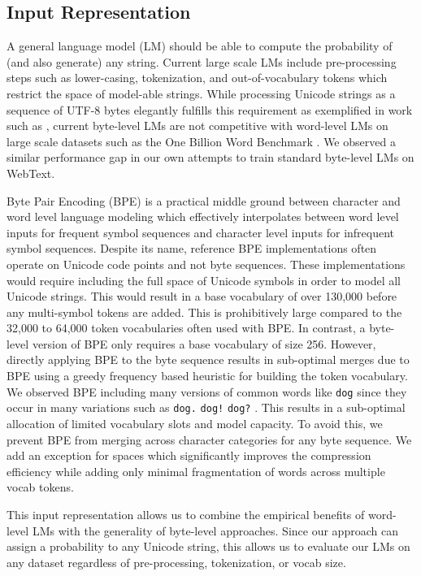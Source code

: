 \documentclass{article}
\begin{document}
\subsection{Input Representation}

A general language model (LM) should be able to compute the probability of (and also generate) any string. Current large scale LMs include pre-processing steps such as lower-casing, tokenization, and out-of-vocabulary tokens which restrict the space of model-able strings. While processing Unicode strings as a sequence of UTF-8 bytes elegantly fulfills this requirement as exemplified in work such as \citet{gillick2015multilingual}, current byte-level LMs are not competitive with word-level LMs on large scale datasets such as the One Billion Word Benchmark \cite{al2018character}. We observed a similar performance gap in our own attempts to train standard byte-level LMs on WebText.

Byte Pair Encoding (BPE) \cite{sennrich2015neural} is a practical middle ground between character and word level language modeling which effectively interpolates between word level inputs for frequent symbol sequences and character level inputs for infrequent symbol sequences. Despite its name, reference BPE implementations often operate on Unicode code points and not byte sequences. These implementations would require including the full space of Unicode symbols in order to model all Unicode strings. This would result in a base vocabulary of over 130,000 before any multi-symbol tokens are added. This is prohibitively large compared to the 32,000 to 64,000 token vocabularies often used with BPE. In contrast, a byte-level version of BPE only requires a base vocabulary of size 256. However, directly applying BPE to the byte sequence results in sub-optimal merges due to BPE using a greedy frequency based heuristic for building the token vocabulary. We observed BPE including many versions of common words like \texttt{dog} since they occur in many variations such as \texttt{dog.} \texttt{dog!} \texttt{dog?} . This results in a sub-optimal allocation of limited vocabulary slots and model capacity. To avoid this, we prevent BPE from merging across character categories for any byte sequence. We add an exception for spaces which significantly improves the compression efficiency while adding only minimal fragmentation of words across multiple vocab tokens.

This input representation allows us to combine the empirical benefits of word-level LMs with the generality of byte-level approaches. Since our approach can assign a probability to any Unicode string, this allows us to evaluate our LMs on any dataset regardless of pre-processing, tokenization, or vocab size.
\end{document}
